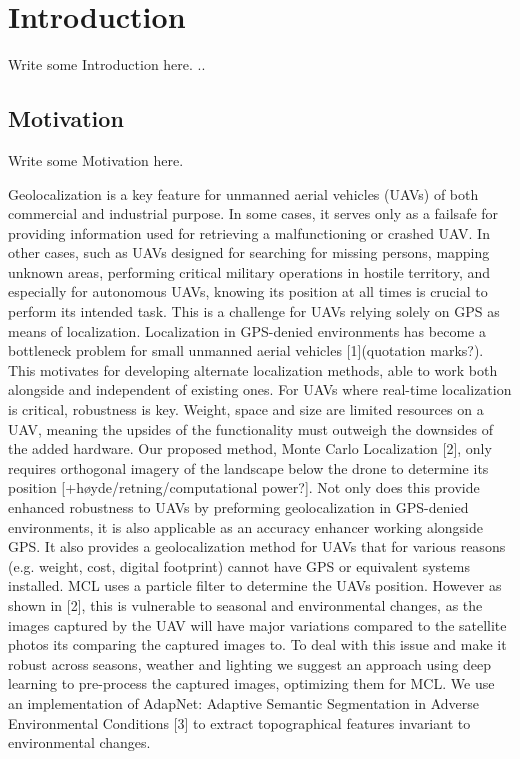 \section{Introduction}     %
Write some Introduction here.
..
\subsection{Motivation}
Write some Motivation here.

\begin{introduction}
Geolocalization is a key feature for unmanned aerial vehicles (UAVs) of both commercial and industrial purpose. In some cases, it serves only as a failsafe for providing information used for retrieving a malfunctioning or crashed UAV. In other cases, such as UAVs designed for searching for missing persons, mapping unknown areas, performing critical military operations in hostile territory, and especially for autonomous UAVs, knowing its position at all times is crucial to perform its intended task. This is a challenge for UAVs relying solely on GPS as means of localization. Localization in GPS-denied environments has become a bottleneck problem for small unmanned aerial vehicles [1](quotation marks?). This motivates for developing alternate localization methods, able to work both alongside and independent of existing ones. For UAVs where real-time localization is critical, robustness is key. Weight, space and size are limited resources on a UAV, meaning the upsides of the functionality must outweigh the downsides of the added hardware. Our proposed method, Monte Carlo Localization [2], only requires orthogonal imagery of the landscape below the drone to determine its position [+høyde/retning/computational power?]. Not only does this provide enhanced robustness to UAVs by preforming geolocalization in GPS-denied environments, it is also applicable as an accuracy enhancer working alongside GPS. It also provides a geolocalization method for UAVs that for various reasons (e.g. weight, cost, digital footprint) cannot have GPS or equivalent systems installed. MCL uses a particle filter to determine the UAVs position. However as shown in [2], this is vulnerable to seasonal and environmental changes, as the images captured by the UAV will have major variations compared to the satellite photos its comparing the captured images to. To deal with this issue and make it robust across seasons, weather and lighting we suggest an approach using deep learning to pre-process the captured images, optimizing them for MCL. We use an implementation of AdapNet: Adaptive Semantic Segmentation in Adverse Environmental Conditions [3] to extract topographical features invariant to environmental changes.


\end{introduction}
